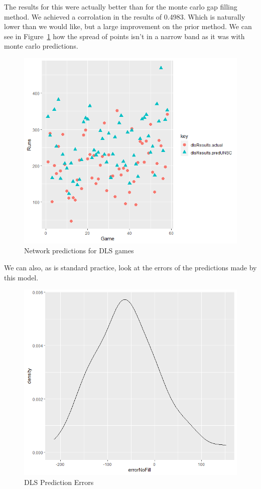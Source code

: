 The results for this were actually better than for the monte carlo gap filling method. We achieved a corrolation in the results of 0.4983. Which is naturally lower than we would like, but a large improvement 
on the prior method. We can see in Figure~\ref{dlspreds} how the spread of points isn't in a narrow band as it was with monte carlo predictions. 

\begin{figure}[h]
    \label{dlspreds}
    \centering
    \caption{Network predictions for DLS games}
    \includegraphics[scale=0.6]{figures/dlsPreds.png}
\end{figure}

We can also, as is standard practice, look at the errors of the predictions made by this model.

\begin{figure}[h]
    \label{dlsErrors}
    \centering
    \caption{DLS Prediction Errors}
    \includegraphics[scale=0.6]{figures/dlsErrorDist.png}
\end{figure}

